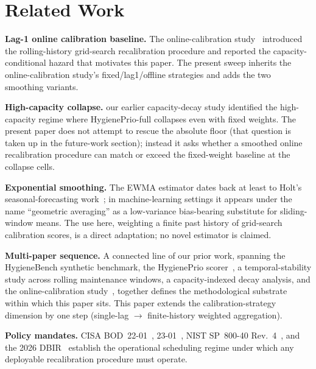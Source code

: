 \section{Related Work}

\textbf{Lag-1 online calibration baseline.}
The online-calibration study~\cite{paper7online} introduced the rolling-history grid-search
recalibration procedure and reported the capacity-conditional hazard
that motivates this paper. The present sweep inherits the online-calibration study's
\textsf{fixed}/\textsf{lag1}/\textsf{offline} strategies and adds the
two smoothing variants.

\textbf{High-capacity collapse.} our earlier capacity-decay study
identified the high-capacity regime where HygienePrio-full collapses
even with fixed weights. The present paper does not attempt to rescue
the absolute floor (that question is taken up in the future-work
section); instead it asks whether a smoothed online recalibration
procedure can match or exceed the fixed-weight baseline at the
collapse cells.

\textbf{Exponential smoothing.}
The EWMA estimator dates back at least to Holt's seasonal-forecasting
work~\cite{holt2004ewma}; in machine-learning settings it appears
under the name ``geometric averaging'' as a low-variance bias-bearing
substitute for sliding-window means. The use here, weighting a
finite past history of grid-search calibration scores, is a direct
adaptation; no novel estimator is claimed.

\textbf{Multi-paper sequence.}
A connected line of our prior work, spanning the HygieneBench synthetic
benchmark, the HygienePrio scorer~\cite{paper4hygieneprio}, a temporal-stability
study across rolling maintenance windows, a capacity-indexed decay analysis,
and the online-calibration study~\cite{paper7online}, together defines the
methodological substrate within which this paper sits. This paper
extends the calibration-strategy dimension by one step (single-lag $\to$
finite-history weighted aggregation).

\textbf{Policy mandates.} CISA BOD~22-01~\cite{cisa2021bod2201},
23-01~\cite{cisa2022bod2301}, NIST SP~800-40 Rev.~4~\cite{nist2022sp80040r4},
and the 2026 DBIR~\cite{verizon2026dbir} establish the operational
scheduling regime under which any deployable recalibration procedure
must operate.
